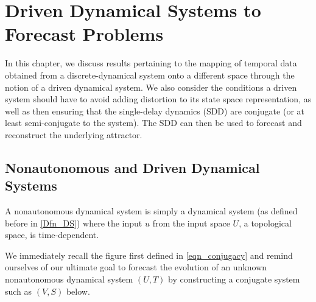 \documentclass[a4paper,12pt,twoside]{book}
\begin{document}






\chapter{Driven Dynamical Systems to Forecast Problems} \label{ch4}

In this chapter, we discuss results pertaining to the mapping of temporal data obtained from a discrete-dynamical system onto a different space through the notion of a driven dynamical system. 
We also consider the conditions a driven system should have to avoid adding distortion to its state space representation, as well as then ensuring that the single-delay dynamics (SDD) are conjugate (or at least semi-conjugate to the system). 
The SDD can then be used to forecast and reconstruct the underlying attractor. 

\section{Nonautonomous and Driven Dynamical Systems}

A nonautonomous dynamical system is simply a dynamical system (as defined before in \ref{Dfn_DS}) where the input $u$ from the input space $U$, a  topological space, is time-dependent.

We immediately recall the figure first defined in \ref{eqn_conjugacy} and remind ourselves of our ultimate goal to forecast the evolution of an unknown nonautonomous dynamical system $(U,T)$ by constructing a conjugate system such as $(V,S)$ below.
\end{document}
